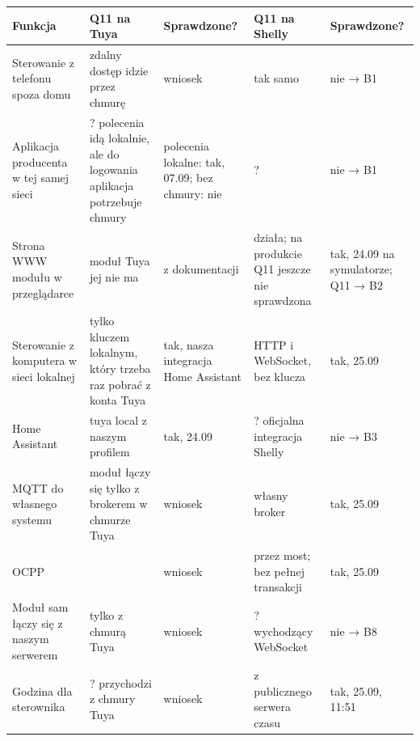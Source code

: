 \documentclass[11pt,a4paper]{article}
\begin{document}
\begin{longtable}{>{\raggedright\arraybackslash}p{3.39cm}>{\raggedright\arraybackslash}p{3.25cm}>{\raggedright\arraybackslash}p{2.35cm}>{\raggedright\arraybackslash}p{3.06cm}>{\raggedright\arraybackslash}p{2.35cm}}
\toprule
\rowcolor{apteallight}\textbf{Funkcja} & \textbf{Q11 na Tuya} & \textbf{Sprawdzone?} & \textbf{Q11 na Shelly} & \textbf{Sprawdzone?} \\
\midrule\endhead
\bottomrule\endfoot
Sterowanie z telefonu spoza domu & \leavevmode{\symbolfont\color{apred}\textbf{✘}} zdalny dostęp idzie przez chmurę & wniosek & \leavevmode{\symbolfont\color{apred}\textbf{✘}} tak samo & nie {\symbolfont→} B1 \\
Aplikacja producenta w tej samej sieci & ? polecenia idą lokalnie, ale do logowania aplikacja potrzebuje chmury & polecenia lokalne: tak, 07.09; bez chmury: nie & ? & nie {\symbolfont→} B1 \\
Strona WWW modułu w przeglądarce & \leavevmode{\symbolfont\color{apred}\textbf{✘}} moduł Tuya jej nie ma & z dokumentacji & \leavevmode{\symbolfont\color{apamber}\textbf{◐}} działa; na produkcie Q11 jeszcze nie sprawdzona & tak, 24.09 na symulatorze; Q11 {\symbolfont→} B2 \\
Sterowanie z komputera w sieci lokalnej & \leavevmode{\symbolfont\color{apamber}\textbf{◐}} tylko kluczem lokalnym, który trzeba raz pobrać z konta Tuya & tak, nasza integracja Home Assistant & \leavevmode{\symbolfont\color{apgreen}\textbf{✔}} HTTP i WebSocket, bez klucza & tak, 25.09 \\
Home Assistant & \leavevmode{\symbolfont\color{apamber}\textbf{◐}} tuya local z naszym profilem & tak, 24.09 & ? oficjalna integracja Shelly & nie {\symbolfont→} B3 \\
MQTT do własnego systemu & \leavevmode{\symbolfont\color{apred}\textbf{✘}} moduł łączy się tylko z brokerem w chmurze Tuya & wniosek & \leavevmode{\symbolfont\color{apgreen}\textbf{✔}} własny broker & tak, 25.09 \\
OCPP & \leavevmode{\symbolfont\color{apred}\textbf{✘}} & wniosek & \leavevmode{\symbolfont\color{apamber}\textbf{◐}} przez most; bez pełnej transakcji & tak, 25.09 \\
Moduł sam łączy się z naszym serwerem & \leavevmode{\symbolfont\color{apred}\textbf{✘}} tylko z chmurą Tuya & wniosek & ? wychodzący WebSocket & nie {\symbolfont→} B8 \\
Godzina dla sterownika & ? przychodzi z chmury Tuya & wniosek & \leavevmode{\symbolfont\color{apgreen}\textbf{✔}} z publicznego serwera czasu & tak, 25.09, 11:51 \\

\end{longtable}
\end{document}
